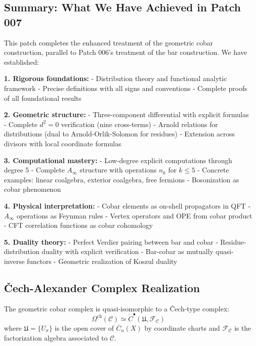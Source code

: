 \subsection{Summary: What We Have Achieved in Patch 007}

\begin{remark}
This patch completes the enhanced treatment of the geometric cobar construction, 
parallel to Patch 006's treatment of the bar construction. We have established:

\textbf{1. Rigorous foundations:}
- Distribution theory and functional analytic framework
- Precise definitions with all signs and conventions
- Complete proofs of all foundational results

\textbf{2. Geometric structure:}
- Three-component differential with explicit formulas
- Complete $d^2 = 0$ verification (nine cross-terms)
- Arnold relations for distributions (dual to Arnold-Orlik-Solomon for residues)
- Extension across divisors with local coordinate formulas

\textbf{3. Computational mastery:}
- Low-degree explicit computations through degree 5
- Complete $A_\infty$ structure with operations $n_k$ for $k \leq 5$
- Concrete examples: linear coalgebra, exterior coalgebra, free fermions
- Bosonization as cobar phenomenon

\textbf{4. Physical interpretation:}
- Cobar elements as on-shell propagators in QFT
- $A_\infty$ operations as Feynman rules
- Vertex operators and OPE from cobar product
- CFT correlation functions as cobar cohomology

\textbf{5. Duality theory:}
- Perfect Verdier pairing between bar and cobar
- Residue-distribution duality with explicit verification
- Bar-cobar as mutually quasi-inverse functors
- Geometric realization of Koszul duality
\end{remark}

\subsection{Čech-Alexander Complex Realization}

\begin{theorem}\label{thm:cobar-cech}
The geometric cobar complex is quasi-isomorphic to a Čech-type complex:
\[
\Omega^{\text{ch}}(\mathcal{C}) \simeq \check{C}^{\bullet}(\mathfrak{U}, \mathcal{F}_{\mathcal{C}})
\]
where $\mathfrak{U} = \{U_{\sigma}\}$ is the open cover of $\overline{C}_n(X)$ by coordinate charts and $\mathcal{F}_{\mathcal{C}}$ is the factorization algebra associated to $\mathcal{C}$.
\end{theorem}

